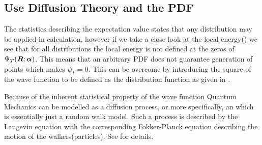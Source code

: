     \subsection{Use Diffusion Theory and the PDF\label{susec:diffTHpdf}}
        The statistics describing the expectation value states that any
        distribution may be applied in calculation, however if we take a close
        look at the local energy() we see that for all
        distributions the local energy is not defined at the zeros of ${\Psi}_T(\boldsymbol{{R}};\boldsymbol{{\alpha}})$.
        This means that an arbitrary PDF does not guarantee generation of
        points which makes $\psi_T=0$. This can be overcome by introducing the
        square of the wave function to be defined as the distribution function
        as given in .

        Because of the inherent statistical property of the wave function
        Quantum Mechanics can be modelled as a diffusion process, or more
        specifically, an  which is
        essentially just a random walk model. Such a process is described by
        the Langevin equation with the corresponding Fokker-Planck equation
        describing the motion of the walkers(particles). See \cite{numstoch}
        for details.

